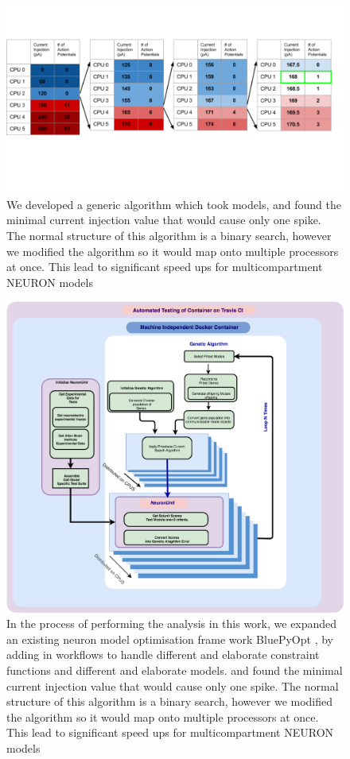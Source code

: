 

\begin{figure}    
\begin{center}
\includegraphics[width=0.7\linewidth]{figures/rheobase_algorithm.png}
\caption{We developed a generic algorithm which took models, and found the minimal current injection value that would cause only one spike. The normal structure of this algorithm is a binary search, however we modified the algorithm so it would map onto multiple processors at once. This lead to significant speed ups for multicompartment NEURON models}

\end{center}
\end{figure}  

\begin{figure}    
\begin{center}
\includegraphics[width=0.7\linewidth]{figures/software_architecture.png}
\caption{In the process of performing the analysis in this work, we expanded an existing neuron model optimisation frame work BluePyOpt \cite{bluepyopt}, by adding in workflows to handle different and elaborate constraint functions and different and elaborate models. and found the minimal current injection value that would cause only one spike. The normal structure of this algorithm is a binary search, however we modified the algorithm so it would map onto multiple processors at once. This lead to significant speed ups for multicompartment NEURON models}

\end{center}
\end{figure}